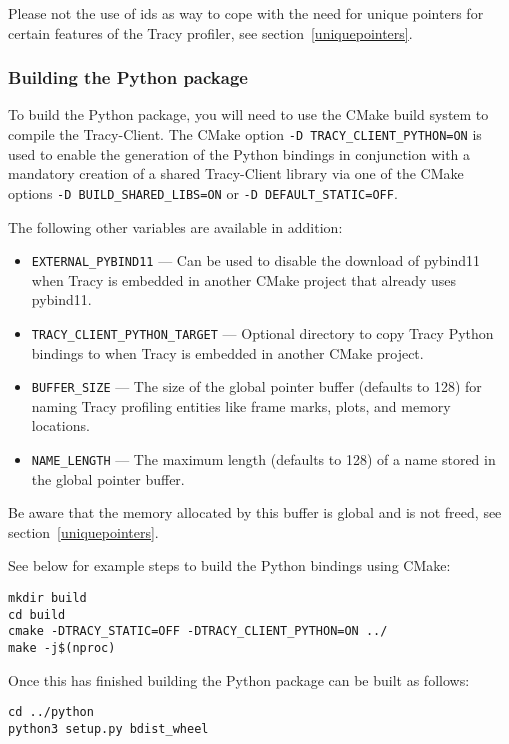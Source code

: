 \documentclass[hidelinks,titlepage,a4paper,twoside]{article}
\begin{document}
Please not the use of ids as way to cope with the need for unique pointers for certain features of the Tracy profiler, see section~\ref{uniquepointers}.

\subsubsection{Building the Python package}

To build the Python package, you will need to use the CMake build system to compile the Tracy-Client.
The CMake option \texttt{-D TRACY\_CLIENT\_PYTHON=ON} is used to enable the generation of the Python bindings in conjunction with a mandatory creation of a shared Tracy-Client library via one of the CMake options \texttt{-D BUILD\_SHARED\_LIBS=ON} or \texttt{-D DEFAULT\_STATIC=OFF}.

The following other variables are available in addition:

\begin{itemize}
\item \texttt{EXTERNAL\_PYBIND11} --- Can be used to disable the download of pybind11 when Tracy is embedded in another CMake project that already uses pybind11.
\item \texttt{TRACY\_CLIENT\_PYTHON\_TARGET} --- Optional directory to copy Tracy Python bindings to when Tracy is embedded in another CMake project.
\item \texttt{BUFFER\_SIZE} --- The size of the global pointer buffer (defaults to 128) for naming Tracy profiling entities like frame marks, plots, and memory locations.
\item \texttt{NAME\_LENGTH} --- The maximum length (defaults to 128) of a name stored in the global pointer buffer.
\end{itemize}

Be aware that the memory allocated by this buffer is global and is not freed, see section~\ref{uniquepointers}.

See below for example steps to build the Python bindings using CMake:

\begin{lstlisting}
mkdir build
cd build
cmake -DTRACY_STATIC=OFF -DTRACY_CLIENT_PYTHON=ON ../
make -j$(nproc)
\end{lstlisting}

Once this has finished building the Python package can be built as follows:

\begin{lstlisting}
cd ../python
python3 setup.py bdist_wheel
\end{lstlisting}
\end{document}
